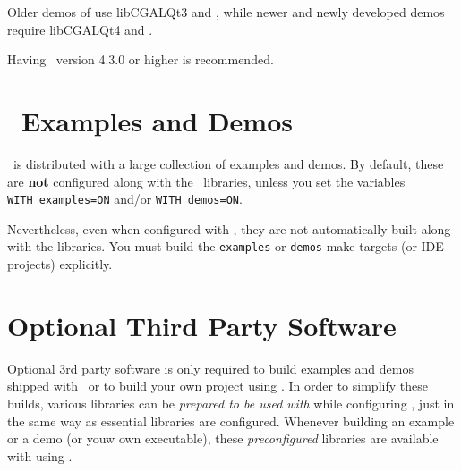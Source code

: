 Older demos of \cgal use libCGALQt3 and , while newer and newly
developed demos require libCGALQt4 and . 

Having \ version 4.3.0 or higher is recommended.

\section{\cgal\ Examples and Demos}

\cgal\ is distributed with a large collection of examples and demos. By default, these are \textbf{not} configured along with
the \cgal\ libraries, unless you set the variables \texttt{WITH\_examples=ON} and/or \texttt{WITH\_demos=ON}.

Nevertheless, even when configured with \cgal, they are not automatically built along with the libraries.
You must build the \texttt{examples} or \texttt{demos} make targets (or IDE projects) explicitly.

\section{Optional Third Party Software\label{sec:optional3rdpartysoftware}}

Optional 3rd party software is only required to build examples and
demos shipped with \cgal\ or to build your own project using \cgal. In order
to simplify these builds, various libraries can be \emph{prepared to be
used with \cgal} while configuring \cgal, just in the same way as
essential libraries are configured. Whenever building an example or a
demo (or youw own executable), these \emph{preconfigured} libraries
are available with using \cgal. 


%
%
%

